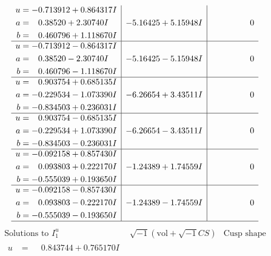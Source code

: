 \documentclass[1p]{elsarticle_modified}
\theoremstyle{definition}
\newcommand{\I}{\sqrt{-1}}
\begin{document}
$$\begin{array}{c|c|c}
\begin{aligned}
u &= -0.713912 + 0.864317 I \\
a &= \phantom{-}0.38520 + 2.30740 I \\
b &= \phantom{-}0.460796 + 1.118670 I\end{aligned}
 & -5.16425 + 5.15948 I & \phantom{-0.000000 } 0 \\ \hline\begin{aligned}
u &= -0.713912 - 0.864317 I \\
a &= \phantom{-}0.38520 - 2.30740 I \\
b &= \phantom{-}0.460796 - 1.118670 I\end{aligned}
 & -5.16425 - 5.15948 I & \phantom{-0.000000 } 0 \\ \hline\begin{aligned}
u &= \phantom{-}0.903754 + 0.685135 I \\
a &= -0.229534 - 1.073390 I \\
b &= -0.834503 + 0.236031 I\end{aligned}
 & -6.26654 + 3.43511 I & \phantom{-0.000000 } 0 \\ \hline\begin{aligned}
u &= \phantom{-}0.903754 - 0.685135 I \\
a &= -0.229534 + 1.073390 I \\
b &= -0.834503 - 0.236031 I\end{aligned}
 & -6.26654 - 3.43511 I & \phantom{-0.000000 } 0 \\ \hline\begin{aligned}
u &= -0.092158 + 0.857430 I \\
a &= \phantom{-}0.093803 + 0.222170 I \\
b &= -0.555039 + 0.193650 I\end{aligned}
 & -1.24389 + 1.74559 I & \phantom{-0.000000 } 0 \\ \hline\begin{aligned}
u &= -0.092158 - 0.857430 I \\
a &= \phantom{-}0.093803 - 0.222170 I \\
b &= -0.555039 - 0.193650 I\end{aligned}
 & -1.24389 - 1.74559 I & \phantom{-0.000000 } 0\\
 \hline 
 \end{array}$$\newpage$$\begin{array}{c|c|c}  
\text{Solutions to }I^u_{1}& \I (\text{vol} + \sqrt{-1}CS) & \text{Cusp shape}\\
 \hline 
\begin{aligned}
u &= \phantom{-}0.843744 + 0.765170 I \\

\end{aligned}
\end{array}$$
\end{document}
